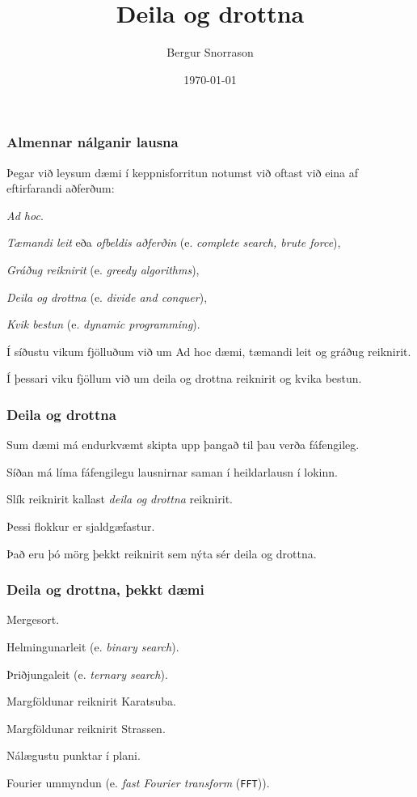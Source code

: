 

\title{Deila og drottna}
\author{Bergur Snorrason}
\date{\today}



\frame{\titlepage}

{
	\frametitle{Almennar nálganir lausna}
	{
		\item<1-> Þegar við leysum dæmi í keppnisforritun notumst við oftast við eina af eftirfarandi aðferðum:
		{
			\item<2-> \emph{Ad hoc}.
			\item<3-> \emph{Tæmandi leit} eða \emph{ofbeldis aðferðin} (e. \emph{complete search, brute force}),
			\item<4-> \emph{Gráðug reiknirit} (e. \emph{greedy algorithms}),
			\item<5-> \emph{Deila og drottna} (e. \emph{divide and conquer}),
			\item<6-> \emph{Kvik bestun} (e. \emph{dynamic programming}).
		}
		\item<7-> Í síðustu vikum fjölluðum við um Ad hoc dæmi, tæmandi leit og gráðug reiknirit.
		\item<8-> Í þessari viku fjöllum við um deila og drottna reiknirit og kvika bestun.
	}
}

{
	\frametitle{Deila og drottna}
	{
		\item<1-> Sum dæmi má endurkvæmt skipta upp þangað til þau verða fáfengileg.
		\item<2-> Síðan má líma fáfengilegu lausnirnar saman í heildarlausn í lokinn.
		\item<3-> Slík reiknirit kallast \emph{deila og drottna} reiknirit.
		\item<4-> Þessi flokkur er sjaldgæfastur.
		\item<5-> Það eru þó mörg þekkt reiknirit sem nýta sér deila og drottna.
	}
}

{
	\frametitle{Deila og drottna, þekkt dæmi}
	{
		\item<1-> Mergesort.
		\item<2-> Helmingunarleit (e. \emph{binary search}).
		\item<3-> Þriðjungaleit (e. \emph{ternary search}).
		\item<4-> Margföldunar reiknirit Karatsuba.
		\item<5-> Margföldunar reiknirit Strassen.
		\item<6-> Nálægustu punktar í plani.
		\item<7-> Fourier ummyndun (e. \emph{fast Fourier transform} (\texttt{FFT})).
	}
}


